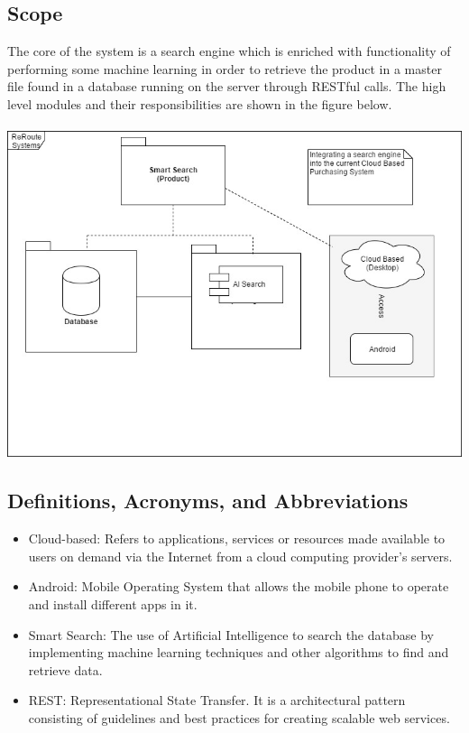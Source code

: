 \documentclass[a4paper,10pt]{article}
\begin{document}
	\subsection{Scope} 
	The core of the system is a search engine which is enriched with functionality
of performing some machine learning in order to retrieve the product in a master file found in a database running on the server through RESTful calls. The high level modules and their responsibilities are shown in the figure below. \\ \\
	\includegraphics[scale=0.62]{scope1.jpg}
	\subsection{Definitions, Acronyms, and Abbreviations} 

	\begin{itemize} 
	\item Cloud-based: Refers to applications, services or resources made available to users on demand via the Internet from a cloud computing provider's servers.
	\item Android: Mobile Operating System that allows the mobile phone to operate and install different apps in it.
	\item Smart Search: The use of Artificial Intelligence to search the database by implementing machine learning techniques and other algorithms to find and retrieve data.
	\item REST: Representational State Transfer. It is a architectural pattern consisting of guidelines and best practices
for creating scalable web services.
	\end{itemize}
\end{document}
